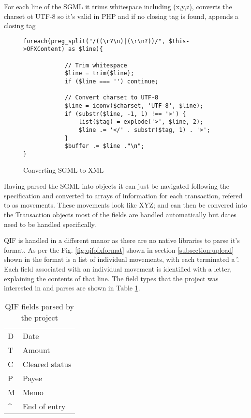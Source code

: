 

For each line of the SGML it trims whitespace including (x,y,z), converts the charset ot UTF-8 so it's valid in PHP and if no closing tag is found, appends a closing tag

\begin{figure}
\lstset{style=phpcolor}
\begin{lstlisting}
foreach(preg_split("/((\r?\n)|(\r\n?))/", $this->OFXContent) as $line){
        		
        	// Trim whitespace
        	$line = trim($line);
        	if ($line === '') continue;
        
        	// Convert charset to UTF-8
        	$line = iconv($charset, 'UTF-8', $line);
        	if (substr($line, -1, 1) !== '>') {
        		list($tag) = explode('>', $line, 2);
        		$line .= '</' . substr($tag, 1) . '>';
        	}
        	$buffer .= $line ."\n";
}
\end{lstlisting}
\caption{Converting SGML to XML}
\end{figure}

Having parsed the SGML into objects it can just be navigated following the specification and converted to arrays of information for each transaction, refered to as movements. These movements look like XYZ; and can then be convered into the Transaction objects most of the fields are handled automatically but dates need to be handled specifically.

QIF is handled in a different manor as there are no native libraries to parse it's format. As per the Fig. \ref{fig:qifofxformat} shown in section \ref{subsection:upload} shown in  the format is a list of individual movements, with each terminated a \^. Each field associated with an individual movement is identified with a letter, explaining the contents of that line.
% 
The field types that the project was interested in and parses are shown in Table \ref{table:qiffields}.

\begin{table}[h]
\centering
\begin{tabular}{ll}
D                  & Date           \\
T                  & Amount         \\
C                  & Cleared status \\
P                  & Payee          \\
M                  & Memo           \\
\textasciicircum   & End of entry  
\end{tabular}
\caption{QIF fields parsed by the project}
\label{table:qiffields}
\end{table}

